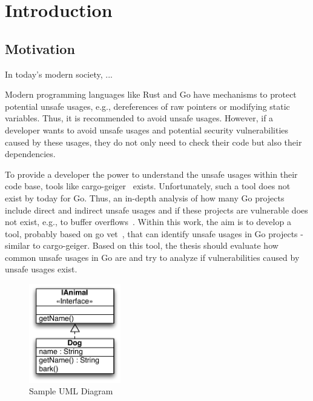 
\chapter{Introduction}\label{ch:introduction}



\section{Motivation}\label{sec:motivation}

In today's modern society, ...

Modern programming languages like Rust and Go have mechanisms to protect potential
unsafe usages, e.g., dereferences of raw pointers or modifying static variables. Thus, it is
recommended to avoid unsafe usages. However, if a developer wants to avoid unsafe
usages and potential security vulnerabilities caused by these usages, they do not only need
to check their code but also their dependencies.

To provide a developer the power to understand the unsafe usages within their code base,
tools like cargo-geiger~\cite{CargoGeiger} exists. Unfortunately, such a tool does not exist by today for Go.
Thus, an in-depth analysis of how many Go projects include direct and indirect unsafe
usages and if these projects are vulnerable does not exist, e.g., to buffer overflows~\cite{larochelle2001, alnaeli2017, wang2020}.
Within this work, the aim is to develop a tool, probably based on go vet~\cite{GoVet}, that can identify
unsafe usages in Go projects - similar to cargo-geiger. Based on this tool, the thesis should
evaluate how common unsafe usages in Go are and try to analyze if vulnerabilities caused
by unsafe usages exist.

\begin{figure}
    \centering
    \includegraphics[width=4cm]{assets/images/uml}
    \caption{Sample UML Diagram}
    \label{fig:uml_example}
\end{figure}



